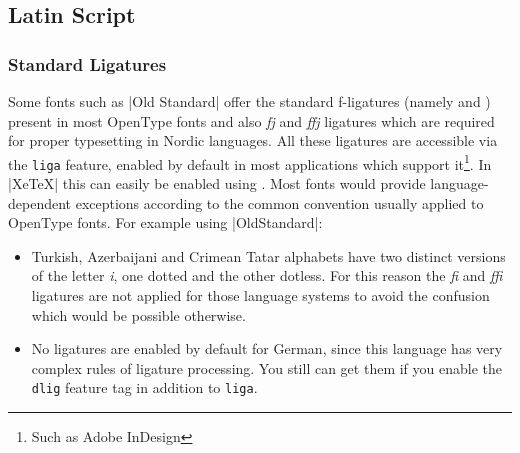 \begin{comment}
%
%
\end{comment}

\subsection{Latin Script}

\subsubsection{Standard Ligatures}

Some fonts such as |Old Standard| offer the standard f-ligatures (namely  and ) present in most OpenType fonts and also
\textit{fj} and \textit{ffj} ligatures which are required for proper
typesetting in Nordic languages. All these ligatures are accessible via the
\texttt{liga} feature, enabled by default in most applications which
support it\footnote{Such as Adobe InDesign}. In |XeTeX| this can easily be enabled using \cmd{\fontspec}\oarg[Ligatures=Common]. Most fonts would provide language-dependent exceptions according to the common convention usually
applied to OpenType fonts. For example using |OldStandard|:

\begin{itemize}
\item Turkish, Azerbaijani and Crimean Tatar alphabets have two distinct
versions of the letter \textit{i}, one dotted and the other dotless. For
this reason the \textit{fi} and \textit{ffi} ligatures are not applied for
those language systems to avoid the confusion which would be possible
otherwise.

\item No ligatures are enabled by default for German, since this language
has very complex rules of ligature processing. You still can get them if
you enable the \texttt{dlig} feature tag in addition to \texttt{liga}.

\end{itemize}

